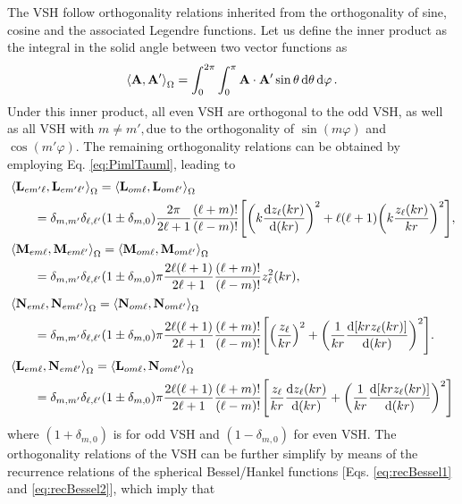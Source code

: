 The VSH follow orthogonality relations inherited from the orthogonality of sine, cosine and the associated Legendre functions. Let us define the inner product as the integral in the solid angle between two vector functions as 
%
\begin{align}
\ev{\vb{A},\vb{A}'}_\Omega = \int_0^{2\pi}\int_0^{\pi} \vb{A}\cdot\vb{A}'\sin\theta\dd{\theta}\dd{\varphi}.
\label{eq:inner}
\end{align}
%
Under this inner product, all even VSH are orthogonal to the odd VSH, as well as all VSH  with $m\neq m', $due to the orthogonality of $\sin(m\varphi)$ and $\cos(m'\varphi)$. The remaining orthogonality relations  can be obtained by employing Eq. \eqref{eq:PimlTauml}, leading to 
%
\begin{align}
&\ev{\vb{L}_{em'\ell},\vb{L}_{em'\ell'}}_\Omega = \ev{\vb{L}_{om\ell},\vb{L}_{om\ell'}}_\Omega \notag\\
	 &\hspace*{2em} =  
 	\delta_{m,m'}\delta_{\ell,\ell'} (1\pm\delta_{m,0}) 
 	\frac{2\pi}{2\ell+1}\frac{(\ell+m)!}{(\ell-m)!}
 	\qty[\qty(k\dv{z_\ell(kr)}{(kr)})^2 + \ell(\ell+1)\qty(k\frac{z_\ell(kr)}{kr})^2],\\
%
&\ev{\vb{M}_{em\ell},\vb{M}_{em\ell'}}_\Omega = \ev{\vb{M}_{om\ell},\vb{M}_{om\ell'}}_\Omega \notag\\
		 &\hspace*{2em} =  
	\delta_{m,m'}\delta_{\ell,\ell'} (1\pm\delta_{m,0}) 
	\pi \frac{2  \ell(\ell+1)}{2\ell+1}\frac{(\ell+m)!}{(\ell-m)!}
	z_{\ell}^2(kr),\\
%
&\ev{\vb{N}_{em\ell},\vb{N}_{em\ell'}}_\Omega = \ev{\vb{N}_{om\ell},\vb{N}_{om\ell'}}_\Omega  \notag\\
	 &\hspace*{2em} =  
	 \delta_{m,m'}\delta_{\ell,\ell'} (1\pm\delta_{m,0}) 
	\pi \frac{2  \ell(\ell+1)}{2\ell+1}\frac{(\ell+m)!}{(\ell-m)!}
	\qty[\qty(\frac{ z_{\ell}}{kr})^2 + \qty(\frac{1}{kr}\dv{[kr z_\ell(kr)]}{(kr)})^2]. \\
&\ev{\vb{L}_{em\ell},\vb{N}_{em\ell'}}_\Omega = \ev{\vb{L}_{om\ell},\vb{N}_{om\ell'}}_\Omega \notag\\
	 &\hspace*{2em} =
	 \delta_{m,m'}\delta_{\ell,\ell'} (1\pm\delta_{m,0}) 
	\pi \frac{2  \ell(\ell+1)}{2\ell+1}\frac{(\ell+m)!}{(\ell-m)!}
	\qty[\frac{ z_{\ell}}{kr}\dv{z_\ell(kr)}{(kr)} + \qty(\frac{1}{kr}\dv{[kr z_\ell(kr)]}{(kr)})^2]
\end{align}
%
where $(1+\delta_{m,0}) $ is for odd VSH and $(1-\delta_{m,0}) $ for even VSH. The orthogonality relations of the VSH can be further simplify by means of the recurrence relations of the spherical Bessel/Hankel functions [Eqs. \eqref{eq:recBessel1} and \eqref{eq:recBessel2}], which imply that
